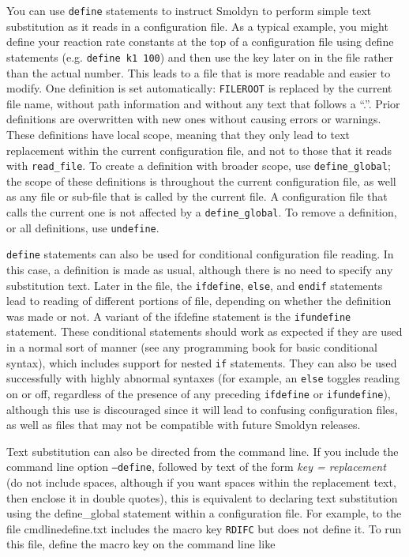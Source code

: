 \documentclass {book}
\newcommand {\ttt} {\texttt}
\newcommand {\param} {\textit}
\begin{document}
You can use \ttt{define} statements to instruct Smoldyn to perform simple text substitution as it reads in a configuration file. As a typical example, you might define your reaction rate constants at the top of a configuration file using define statements (e.g. \ttt{define k1 100}) and then use the key later on in the file rather than the actual number. This leads to a file that is more readable and easier to modify. One definition is set automatically: \ttt{FILEROOT} is replaced by the current file name, without path information and without any text that follows a ``.''. Prior definitions are overwritten with new ones without causing errors or warnings. These definitions have local scope, meaning that they only lead to text replacement within the current configuration file, and not to those that it reads with \ttt{read\_file}. To create a definition with broader scope, use \ttt{define\_global}; the scope of these definitions is throughout the current configuration file, as well as any file or sub-file that is called by the current file. A configuration file that calls the current one is not affected by a \ttt{define\_global}. To remove a definition, or all definitions, use \ttt{undefine}.

\ttt{define} statements can also be used for conditional configuration file reading. In this case, a definition is made as usual, although there is no need to specify any substitution text. Later in the file, the \ttt{ifdefine}, \ttt{else}, and \ttt{endif} statements lead to reading of different portions of file, depending on whether the definition was made or not. A variant of the ifdefine statement is the \ttt{ifundefine} statement. These conditional statements should work as expected if they are used in a normal sort of manner (see any programming book for basic conditional syntax), which includes support for nested \ttt{if} statements. They can also be used successfully with highly abnormal syntaxes (for example, an \ttt{else} toggles reading on or off, regardless of the presence of any preceding \ttt{ifdefine} or \ttt{ifundefine}), although this use is discouraged since it will lead to confusing configuration files, as well as files that may not be compatible with future Smoldyn releases.

Text substitution can also be directed from the command line. If you include the command line option \ttt{--define}, followed by text of the form \param{key = replacement} (do not include spaces, although if you want spaces within the replacement text, then enclose it in double quotes), this is equivalent to declaring text substitution using the define\_global statement within a configuration file. For example, to the file cmdlinedefine.txt includes the macro key \ttt{RDIFC} but does not define it. To run this file, define the macro key on the command line like
\end{document}
